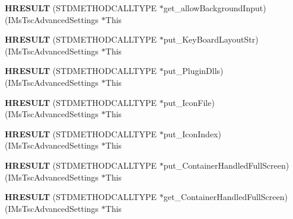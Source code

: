 \begin{DoxyCompactItemize}
{\bfseries H\+R\+E\+S\+U\+LT} (S\+T\+D\+M\+E\+T\+H\+O\+D\+C\+A\+L\+L\+T\+Y\+PE $\ast$get\+\_\+allow\+Background\+Input)(I\+Ms\+Tsc\+Advanced\+Settings $\ast$This
\item 
\mbox{\label{struct_i_ms_tsc_advanced_settings_vtbl_ae9771e869b2650e21c014adf0be55596}} 
{\bfseries H\+R\+E\+S\+U\+LT} (S\+T\+D\+M\+E\+T\+H\+O\+D\+C\+A\+L\+L\+T\+Y\+PE $\ast$put\+\_\+\+Key\+Board\+Layout\+Str)(I\+Ms\+Tsc\+Advanced\+Settings $\ast$This
\item 
\mbox{\label{struct_i_ms_tsc_advanced_settings_vtbl_ae61bfe43ff488ae80c6aa6dcd48f586d}} 
{\bfseries H\+R\+E\+S\+U\+LT} (S\+T\+D\+M\+E\+T\+H\+O\+D\+C\+A\+L\+L\+T\+Y\+PE $\ast$put\+\_\+\+Plugin\+Dlls)(I\+Ms\+Tsc\+Advanced\+Settings $\ast$This
\item 
\mbox{\label{struct_i_ms_tsc_advanced_settings_vtbl_ab09050f364e1f807ed9579ff7262d1a1}} 
{\bfseries H\+R\+E\+S\+U\+LT} (S\+T\+D\+M\+E\+T\+H\+O\+D\+C\+A\+L\+L\+T\+Y\+PE $\ast$put\+\_\+\+Icon\+File)(I\+Ms\+Tsc\+Advanced\+Settings $\ast$This
\item 
\mbox{\label{struct_i_ms_tsc_advanced_settings_vtbl_a236568877d867f6bacbde146777a487c}} 
{\bfseries H\+R\+E\+S\+U\+LT} (S\+T\+D\+M\+E\+T\+H\+O\+D\+C\+A\+L\+L\+T\+Y\+PE $\ast$put\+\_\+\+Icon\+Index)(I\+Ms\+Tsc\+Advanced\+Settings $\ast$This
\item 
\mbox{\label{struct_i_ms_tsc_advanced_settings_vtbl_a3a60ee12f15c8e1a6a5498db5c8c639b}} 
{\bfseries H\+R\+E\+S\+U\+LT} (S\+T\+D\+M\+E\+T\+H\+O\+D\+C\+A\+L\+L\+T\+Y\+PE $\ast$put\+\_\+\+Container\+Handled\+Full\+Screen)(I\+Ms\+Tsc\+Advanced\+Settings $\ast$This
\item 
\mbox{\label{struct_i_ms_tsc_advanced_settings_vtbl_a79226b6493c2df0b98d5ab71982f153c}} 
{\bfseries H\+R\+E\+S\+U\+LT} (S\+T\+D\+M\+E\+T\+H\+O\+D\+C\+A\+L\+L\+T\+Y\+PE $\ast$get\+\_\+\+Container\+Handled\+Full\+Screen)(I\+Ms\+Tsc\+Advanced\+Settings $\ast$This
\item 
\mbox{\label{struct_i_ms_tsc_advanced_settings_vtbl_a615bdf6d487076addce9947dc121adaa}} 

\end{DoxyCompactItemize}
